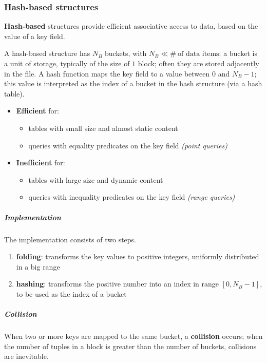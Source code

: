 \documentclass[english]{article}
\begin{document}
\subsubsection{Hash-based structures}

\textbf{Hash-based} structures provide efficient associative access to data, based on the value of a key field.

A hash-based structure has \(N_B\) buckets, with \(N_B \ll \# \ \text{of data items}\):
a bucket is a unit of storage, typically of the size of \(1\) block;
often they are stored adjacently in the file.
A hash function maps the key field to a value between \(0\) and \(N_B -1\);
this value is interpreted as the index of a bucket in the hash structure (via a hash table).

\begin{itemize}
  \item \textbf{Efficient} for:
        \begin{itemize}[label=\cmarkthin]
          \item tables with small size and almost static content
          \item queries with equality predicates on the key field \textit{(point queries)}
        \end{itemize}
  \item \textbf{Inefficient} for:
        \begin{itemize}[label=\xmarkthin]
          \item tables with large size and dynamic content
          \item queries with inequality predicates on the key field \textit{(range queries)}
        \end{itemize}
\end{itemize}

\subparagraph*{Implementation}
The implementation consists of two steps.

\begin{enumerate}[label=step \arabic*., leftmargin=*, widest*=7, labelindent=1em]
  \item \textbf{folding}: transforms the key values to positive integers, uniformly distributed in a big range
  \item \textbf{hashing}: transforms the positive number into an index in range \(\left[ 0, N_B - 1 \right]\), to be used as the index of a bucket
\end{enumerate}

\subparagraph*{Collision}
When two or more keys are mapped to the same bucket, a \textbf{collision} occurs;
when the number of tuples in a block is greater than the number of buckets, collisions are inevitable.
\end{document}
